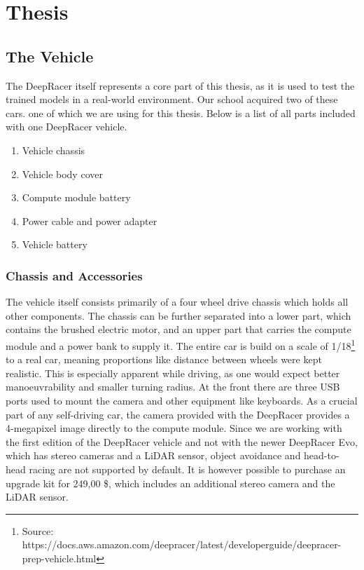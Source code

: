 \chapter{Thesis}
\label{cha:Diplomschrift}

\section{The Vehicle}

The DeepRacer itself represents a core part of this thesis, as it is used to test the trained models in a real-world environment. Our school acquired two of these cars. one of which we are using for this thesis. Below is a list of all parts included with one DeepRacer vehicle.

\begin{enumerate}
    \item Vehicle chassis
    \item Vehicle body cover
    \item Compute module battery
    \item Power cable and power adapter
    \item Vehicle battery
\end{enumerate}

\subsection{Chassis and Accessories}
The vehicle itself consists primarily of a four wheel drive chassis which holds all other components. The chassis can be further separated into a lower part, which contains the brushed electric motor, and an upper part that carries the compute module and a power bank to supply it. The entire car is build on a scale of 1/18\footnote{Source: https://docs.aws.amazon.com/deepracer/latest/developerguide/deepracer-prep-vehicle.html} to a real car, meaning proportions like distance between wheels were kept realistic. This is especially apparent while driving, as one would expect better manoeuvrability and smaller turning radius.
At the front there are three USB ports used to mount the camera and other equipment like keyboards. As a crucial part of any self-driving car, the camera provided with the DeepRacer provides a 4-megapixel image directly to the compute module. Since we are working with the first edition of the DeepRacer vehicle and not with the newer DeepRacer Evo, which has stereo cameras and a LiDAR sensor, object avoidance and head-to-head racing are not supported by default. It is however possible to purchase an upgrade kit for 249,00 \$, which includes an additional stereo camera and the LiDAR sensor.

